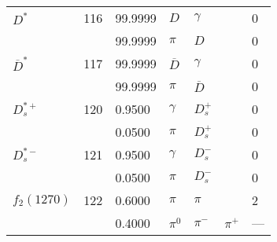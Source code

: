\documentclass[a4paper,10pt]{article}
\begin{document}
\begin{tabular} {lrlllll}
\midrule
$      D^*           $&116& 99.9999&$ D                   $&$ \gamma              $&$                     $& 0\\
$                    $&   & 99.9999&$ \pi                 $&$ D                   $&$                     $& 0\\
\midrule
$      \overline{D}^*$&117& 99.9999&$ \overline{D}        $&$ \gamma              $&$                     $& 0\\
$                    $&   & 99.9999&$ \pi                 $&$ \overline{D}        $&$                     $& 0\\
\midrule
$      D_s^{*+}      $&120&  0.9500&$ \gamma              $&$ D_s^+               $&$                     $& 0\\
$                    $&   &  0.0500&$ \pi                 $&$ D_s^+               $&$                     $& 0\\
\midrule
$      D_s^{*-}      $&121&  0.9500&$ \gamma              $&$ D_s^-               $&$                     $& 0\\
$                    $&   &  0.0500&$ \pi                 $&$ D_s^-               $&$                     $& 0\\
\midrule
$      f_2(1270)     $&122&  0.6000&$ \pi                 $&$ \pi                 $&$                     $& 2\\
$                    $&   &  0.4000&$ \pi^0               $&$ \pi^-               $&$ \pi^+               $& ---\\
\bottomrule
\end{tabular}
\setcounter{section}{2}
\setcounter{subsection}{0}
\end{document}
